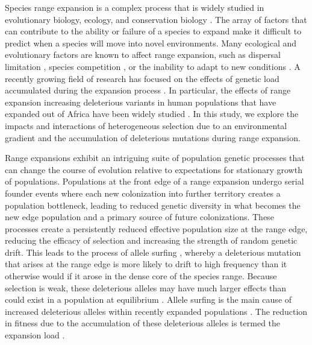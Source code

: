 Species range expansion is a complex process that is widely studied in evolutionary biology, ecology, and conservation biology \citep{Chen:2011, Colautti:2013, Hastings:2005, Phillips:2006, Excoffier:2009, Hallatschek:2010}. The array of factors that can contribute to the ability or failure of a species to expand make it difficult to predict when a species will move into novel environments. Many ecological and evolutionary factors are known to affect range expansion, such as dispersal limitation \citep{Hargreaves:2014b, Marsico:2009, Hastings:2005}, species competition \citep{Case:2000, Price:2009,Svenning:2014, Louthan:2015}, or the inability to adapt to new conditions \citep{Polechova:2015, Holt:2011, Angert:2008}. A recently growing field of research has focused on the effects of genetic load accumulated during the expansion process \citep{Excoffier:2009, Hallatschek:2010, Peischl:2013, Peischl:2015, Peischl:2015b}. In particular, the effects of range expansion increasing deleterious variants in human populations that have expanded out of Africa have been widely studied \citep{Henn:2015, Do:2015, Lohmueller:2008}. In this study, we explore the impacts and interactions of heterogeneous selection due to an environmental gradient and the accumulation of deleterious mutations during range expansion.

Range expansions exhibit an intriguing suite of population genetic processes that can change the course of evolution relative to expectations for stationary growth of populations. Populations at the front edge of a range expansion undergo serial founder events where each new colonization into further territory creates a population bottleneck, leading to reduced genetic diversity in what becomes the new edge population and a primary source of future colonizations. These processes create a persistently reduced effective population size at the range edge, reducing the efficacy of selection and increasing the strength of random genetic drift. This leads to the process of allele surfing \citep{Klopfstein:2006}, whereby a deleterious mutation that arises at the range edge is more likely to drift to high frequency than it otherwise would if it arose in the dense core of the species range. Because selection is weak, these deleterious alleles may have much larger effects than could exist in a population at equilibrium \citep{Peischl:2015}. Allele surfing is the main cause of increased deleterious alleles within recently expanded populations \citep{Excoffier:2009}. The reduction in fitness due to the accumulation of these deleterious alleles is termed the expansion load \citep{Peischl:2013,Peischl:2015}.

